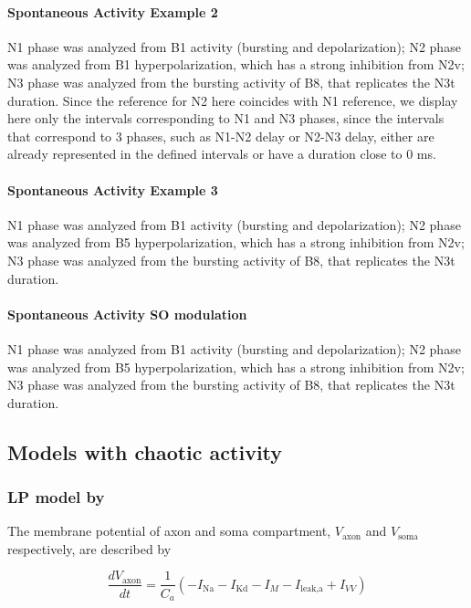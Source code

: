 \paragraph{Spontaneous Activity Example 2}
N1 phase was analyzed from B1 activity (bursting and depolarization); N2 phase was analyzed from B1 hyperpolarization, which has a strong inhibition from N2v; N3 phase was analyzed from the bursting activity of B8, that replicates the N3t duration. 
Since the reference for N2 here coincides with N1 reference, we display here only the intervals corresponding to N1 and N3 phases, since the intervals that correspond to 3 phases, such as N1-N2 delay or N2-N3 delay, either are already represented in the defined intervals or have a duration close to 0 ms.

\paragraph{Spontaneous Activity Example 3}
N1 phase was analyzed from B1 activity (bursting and depolarization); N2 phase was analyzed from B5 hyperpolarization, which has a strong inhibition from N2v; N3 phase was analyzed from the bursting activity of B8, that replicates the N3t duration. 

\paragraph{Spontaneous Activity SO modulation}
N1 phase was analyzed from B1 activity (bursting and depolarization); N2 phase was analyzed from B5 hyperpolarization, which has a strong inhibition from N2v; N3 phase was analyzed from the bursting activity of B8, that replicates the N3t duration. 




\subsection{Models with chaotic activity}

\subsubsection{LP model by \cite{nowotny_probing_2008}}

The membrane potential of axon and soma compartment, $V_{\text{axon}}$ and $V_{\text{soma}}$ respectively, are described by

\begin{equation}
	\frac{dV_{\text{axon}}}{dt} = \frac{1}{C_a} \left( -I_{\text{Na}} - I_{\text{Kd}} - I_M - I_{\text{leak,a}} + I_{VV} \right)
\end{equation}

